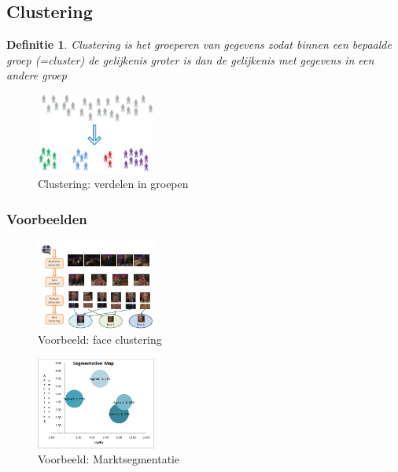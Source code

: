 \documentclass{article}
\newtheorem{theorem}{Definitie}[section]
\begin{document}
\subsection{Clustering}

\begin{theorem}
    Clustering is het groeperen van gegevens zodat binnen een bepaalde groep (=cluster) 
    de gelijkenis groter is dan de gelijkenis met gegevens in een andere groep
\end{theorem}

\begin{figure}[H]
    \centering
    \includegraphics[width=0.35\textwidth]{clustering.png}
    \caption{Clustering: verdelen in groepen}
\end{figure}

\subsubsection{Voorbeelden}

\begin{figure}[H]
    \centering
    \includegraphics[width=0.35\textwidth]{clustering-voorbeeld.png}
    \caption{Voorbeeld: face clustering}
\end{figure}

\begin{figure}[H]
    \centering
    \includegraphics[width=0.35\textwidth]{clustering-marktsegmentatie.png}
    \caption{Voorbeeld: Marktsegmentatie}
\end{figure}
\end{document}
